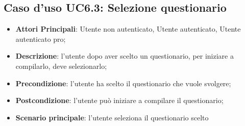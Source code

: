 \subsection{Caso d'uso UC6.3: Selezione questionario}
\begin{itemize}
\item\textbf{Attori Principali}: Utente non autenticato, Utente autenticato, Utente autenticato pro;
\item\textbf{Descrizione}: l'utente dopo aver scelto un questionario, per iniziare a compilarlo, deve selezionarlo;
\item\textbf{Precondizione}: l'utente ha scelto il questionario che vuole svolgere;
\item\textbf{Postcondizione}: l'utente può iniziare a compilare il questionario;
\item\textbf{Scenario principale}: l'utente seleziona il questionario scelto
\end{itemize}